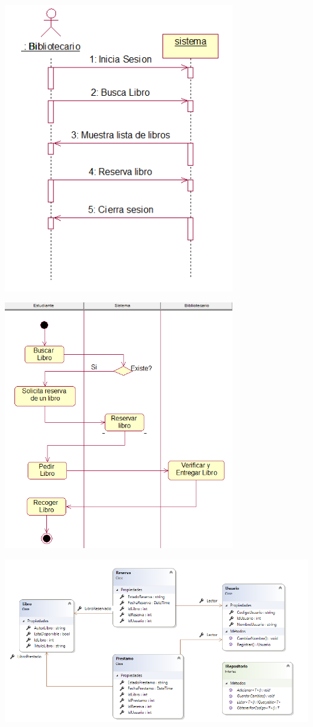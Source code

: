 \begin{enumerate}[1.]
	\begin{center}
	\includegraphics[width=10cm]{./Imagenes/img5} 
	\end{center}
	
	\begin{center}
	\includegraphics[width=10cm]{./Imagenes/img6} 
	\end{center}
	
	\begin{center}
	\includegraphics[width=20cm]{./Imagenes/img7} 
	\end{center}
	
	
\end{enumerate} 
